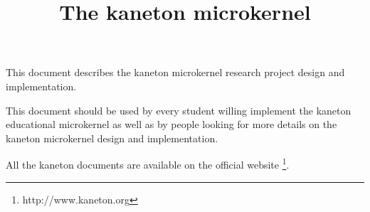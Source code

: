 %
%
%
%
%
%

%
%

%
%

\def\path{../..}

%
%



%
%


%
%

\title{The kaneton microkernel \\
       \version
       \logo}

%
%



%
%

\maketitle

%
%

This document describes the kaneton microkernel research project design
and implementation.

\-

This document should be used by every student willing implement the
kaneton educational microkernel as well as by people looking for more
details on the kaneton microkernel design and implementation.

\-

All the kaneton documents are available on
the official website
  \footnote{http://www.kaneton.org}.

%
%

\tableofcontents

%
%

\indentation{}

%
%











